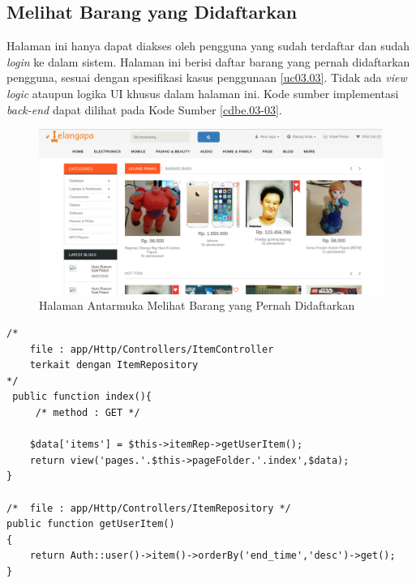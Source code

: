 \subsection{Melihat Barang yang Didaftarkan}
Halaman ini hanya dapat diakses oleh pengguna yang sudah terdaftar dan sudah \textit{login} ke dalam sistem. Halaman ini berisi daftar barang yang pernah didaftarkan pengguna, sesuai dengan spesifikasi kasus penggunaan \ref{uc03.03}. \indent Tidak ada \textit{view logic} ataupun logika UI khusus dalam halaman ini. Kode sumber implementasi \textit{back-end} dapat dilihat pada Kode Sumber \ref{cdbe.03-03}.
\begin{figure}[H]
	\centering
	\includegraphics[width=.85\textwidth]{images/bab4/ui/02-01.png}
	\caption{Halaman Antarmuka Melihat Barang yang Pernah Didaftarkan}
	\label{ui.03-03}
\end{figure}
\newpage
\begin{lstlisting}[label=cdbe.03-03,style=php,caption=Implementasi \textit{Back-end} Melihat Barang yang Pernah Didaftarkan]
/*	
	file : app/Http/Controllers/ItemController
	terkait dengan ItemRepository
*/
 public function index(){
	 /*	method : GET */
	
    $data['items'] = $this->itemRep->getUserItem();
    return view('pages.'.$this->pageFolder.'.index',$data);
}

/*	file : app/Http/Controllers/ItemRepository */
public function getUserItem()
{
    return Auth::user()->item()->orderBy('end_time','desc')->get();
}
\end{lstlisting}


